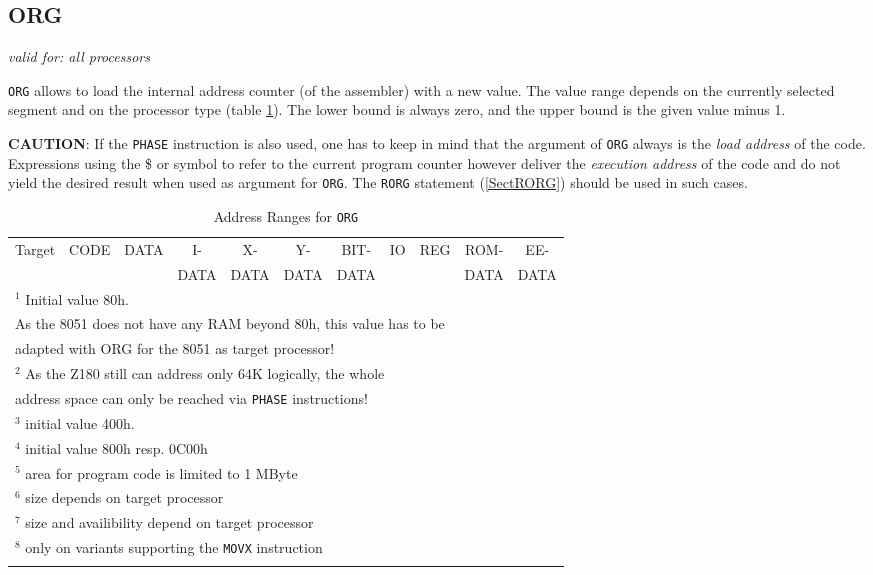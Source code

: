 \documentclass[12pt,twoside]{report}
\makeatletter
\newcommand{\tty}[1]{{\tt #1}}
\newcommand{\tin}[1]{{\scriptsize #1}}
\newcommand{\ttindex}[1]{\index{#1@{\tt #1}}}
\makeatother
\begin{document}

\subsection{ORG}
\label{SectORG}
\ttindex{ORG}

{\em valid for: all processors}

\tty{ORG} allows to load the internal address counter (of the assembler)
with a new value. The value range depends on the currently selected
segment and on the processor type (table \ref{TabORG}).
The lower bound is always zero, and the upper bound is the given value
minus 1.
\par
{\bf CAUTION}: If the \tty{PHASE} instruction is also used, one
has to keep in mind that the argument of \tty{ORG} always is the
{\em load address} of the code.  Expressions using the \$ or \*
symbol to refer to the current program counter however deliver
the {\em execution address} of the code and do not yield the
desired result when used as argument for \tty{ORG}.  The
\tty{RORG} statement (\ref{SectRORG}) should be used in such cases.

\hfuzz=25pt
\small
\begin{longtable}{|l|c|c|c|c|c|c|c|c|c|c|}
\hline
\tin{Target} & \tin{CODE} & \tin{DATA} & \tin{I-}   & \tin{X-}   & \tin{Y-}   & \tin{BIT-} & \tin{IO} & \tin{REG} & \tin{ROM-}  & \tin{EE-}  \\
             &            &            & \tin{DATA} & \tin{DATA} & \tin{DATA} & \tin{DATA} &          &           & \tin{DATA}  & \tin{DATA} \\
\hline
\hline
\endhead

\hline
\multicolumn{11}{|l|}{$^{1}$ Initial value 80h.} \\
\multicolumn{11}{|l|}{   As the 8051 does not have any RAM beyond 80h, this value has to be} \\
\multicolumn{11}{|l|}{   adapted with ORG for the 8051 as target processor!}\\
\hline
\multicolumn{11}{|l|}{$^{2}$ As the Z180 still can address only 64K logically, the whole}\\
\multicolumn{11}{|l|}{   address space can only be reached via \tty{PHASE} instructions!}\\
\hline
\multicolumn{11}{|l|}{$^{3}$ initial value 400h.}\\
\hline
\multicolumn{11}{|l|}{$^{4}$ initial value 800h resp. 0C00h} \\
\hline
\multicolumn{11}{|l|}{$^{5}$ area for program code is limited to 1 MByte} \\
\hline
\multicolumn{11}{|l|}{$^{6}$ size depends on target processor} \\
\hline
\multicolumn{11}{|l|}{$^{7}$ size and availibility depend on target processor} \\
\hline
\multicolumn{11}{|l|}{$^{8}$ only on variants supporting the \tty{MOVX} instruction} \\
\hline
\caption{Address Ranges for \tty{ORG}}
\label{TabORG}
\end{longtable}
\normalsize
\hfuzz=0pt
\end{document}
